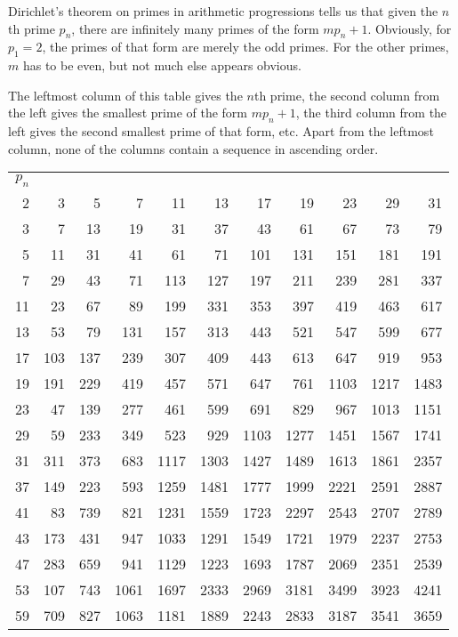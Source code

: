 \documentclass[12pt]{article}
\begin{document}
Dirichlet's theorem on primes in arithmetic progressions tells us that given the $n$th prime $p_n$, there are infinitely many primes of the form $mp_n + 1$. Obviously, for $p_1 = 2$, the primes of that form are merely the odd primes. For the other primes, $m$ has to be even, but not much else appears obvious.

The leftmost column of this table gives the $n$th prime, the second column from the left gives the smallest prime of the form $mp_n + 1$, the third column from the left gives the second smallest prime of that form, etc. Apart from the leftmost column, none of the columns contain a sequence in ascending order.

\begin{tabular}{|r|r|r|r|r|r|r|r|r|r|r|}
$p_n$ &   &   &   &    &    &    &    &    &    &    \\
2 & 3 & 5 & 7 & 11 & 13 & 17 & 19 & 23 & 29 & 31 \\
3 & 7 & 13 & 19 & 31 & 37 & 43 & 61 & 67 & 73 & 79 \\
5 & 11 & 31 & 41 & 61 & 71 & 101 & 131 & 151 & 181 & 191 \\
7 & 29 & 43 & 71 & 113 & 127 & 197 & 211 & 239 & 281 & 337 \\
11 & 23 & 67 & 89 & 199 & 331 & 353 & 397 & 419 & 463 & 617 \\
13 & 53 & 79 & 131 & 157 & 313 & 443 & 521 & 547 & 599 & 677 \\
17 & 103 & 137 & 239 & 307 & 409 & 443 & 613 & 647 & 919 & 953 \\
19 & 191 & 229 & 419 & 457 & 571 & 647 & 761 & 1103 & 1217 & 1483 \\
23 & 47 & 139 & 277 & 461 & 599 & 691 & 829 & 967 & 1013 & 1151 \\
29 & 59 & 233 & 349 & 523 & 929 & 1103 & 1277 & 1451 & 1567 & 1741 \\
31 & 311 & 373 & 683 & 1117 & 1303 & 1427 & 1489 & 1613 & 1861 & 2357 \\
37 & 149 & 223 & 593 & 1259 & 1481 & 1777 & 1999 & 2221 & 2591 & 2887 \\
41 & 83 & 739 & 821 & 1231 & 1559 & 1723 & 2297 & 2543 & 2707 & 2789 \\
43 & 173 & 431 & 947 & 1033 & 1291 & 1549 & 1721 & 1979 & 2237 & 2753 \\
47 & 283 & 659 & 941 & 1129 & 1223 & 1693 & 1787 & 2069 & 2351 & 2539 \\
53 & 107 & 743 & 1061 & 1697 & 2333 & 2969 & 3181 & 3499 & 3923 & 4241 \\
59 & 709 & 827 & 1063 & 1181 & 1889 & 2243 & 2833 & 3187 & 3541 & 3659 \\

\end{tabular}
\end{document}

